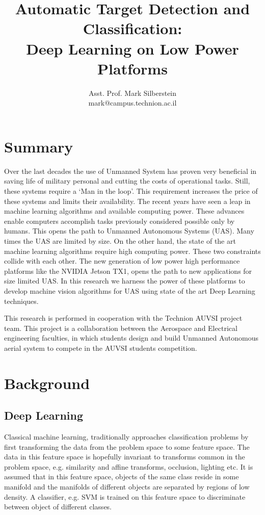 \documentclass{article} %
\title{Automatic Target Detection and Classification: \\
  Deep Learning on Low Power Platforms}
\author{
  Asst. Prof. Mark Silberstein \\
  mark@campus.technion.ac.il\\
}
\begin{document}
\maketitle

\section{Summary}

Over the last decades the use of Unmanned System has proven very beneficial in
saving life of military personal and cutting the costs of operational tasks.
Still, these systems require a `Man in the loop'. This requirement increases the price
of these systems and limits their availability.
The recent years have seen a leap in machine learning algorithms and available
computing power. These advances enable computers accomplish tasks
previously considered possible only by humans.
This opens the path to Unmanned Autonomous Systems (UAS).
Many times the UAS are limited by size. On the other hand, the state of the
art machine learning algorithms require high computing power. These two
constraints collide with each other.
The new generation of low power high performance platforms like the NVIDIA
Jetson TX1, opens the path to new applications for size limited UAS.
In this research we harness the power of these platforms to develop machine vision
algorithms for UAS using state of the art Deep Learning techniques. 

This research is performed in cooperation with the Technion AUVSI project team.
This project is a collaboration between the Aerospace and Electrical engineering
faculties, in which students design and build Unmanned Autonomous aerial system
to compete in the AUVSI students competition.

\section{Background}

\subsection{Deep Learning}
\label{sec:classical_mv_solution}

Classical machine learning, traditionally approaches classification problems
by first transforming the data from the problem space to some feature
space. The data in this feature space is hopefully invariant to transforms common
in the problem space, e.g. similarity and affine transforms, occlusion, lighting
etc. It is assumed that in this feature space, objects of the same class reside
in some manifold and the manifolds of different objects are separated by regions
of low density. A classifier, e.g. SVM is trained on this feature space to
discriminate between object of different classes.
\end{document}

